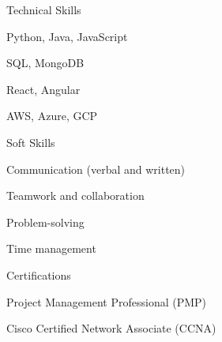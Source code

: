 \documentclass[../resume.tex]{subfiles}
\begin{document}
\skill
{Technical Skills}
{
  \item Python, Java, JavaScript
  \item SQL, MongoDB
  \item React, Angular
  \item AWS, Azure, GCP
}

\skill
{Soft Skills}
{
  \item Communication (verbal and written)
  \item Teamwork and collaboration
  \item Problem-solving
  \item Time management
}

\skill
{Certifications}
{
  \item Project Management Professional (PMP)
  \item Cisco Certified Network Associate (CCNA)
}
\end{document}
